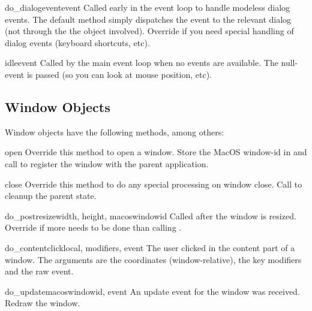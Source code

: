 \begin{funcdesc}{do_dialogevent}{event}
Called early in the event loop to handle modeless dialog events. The
default method simply dispatches the event to the relevant dialog (not
through the the  object involved). Override if you
need special handling of dialog events (keyboard shortcuts, etc).
\end{funcdesc}

\begin{funcdesc}{idle}{event}
Called by the main event loop when no events are available. The
null-event is passed (so you can look at mouse position, etc).
\end{funcdesc}

\subsection{Window Objects}

Window objects have the following methods, among others:


\begin{funcdesc}{open}{}
Override this method to open a window. Store the MacOS window-id in
 and call  to register the
window with the parent application.
\end{funcdesc}

\begin{funcdesc}{close}{}
Override this method to do any special processing on window
close. Call  to cleanup the parent state.
\end{funcdesc}

\begin{funcdesc}{do_postresize}{width, height, macoswindowid}
Called after the window is resized. Override if more needs to be done
than calling .
\end{funcdesc}

\begin{funcdesc}{do_contentclick}{local, modifiers, event}
The user clicked in the content part of a window. The arguments are
the coordinates (window-relative), the key modifiers and the raw
event.
\end{funcdesc}

\begin{funcdesc}{do_update}{macoswindowid, event}
An update event for the window was received. Redraw the window.
\end{funcdesc}


